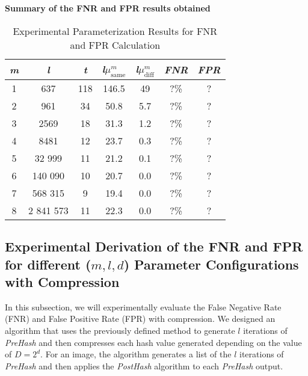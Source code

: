 \textbf{Summary of the FNR and FPR results obtained}
\begin{table}[htbp] 
    \centering
    \begin{tabular}{|c|c|c|c|c|c|c|}
        \hline
        \textit{m} & \textit{l} & \textit{t} & \textit{l}\(\mu_{\text{same}}^m\) & \textit{l}\(\mu_{\text{diff}}^m\) & \textit{FNR} & \textit{FPR} \\
        \hline
        1 & 637 & 118 & 146.5 & 49 & ?\% & ? \\
        2 & 961 & 34 & 50.8 & 5.7 & ?\% & ? \\
        3 & 2569 & 18 & 31.3 & 1.2 & ?\% & ? \\
        4 & 8481 & 12 & 23.7 & 0.3 & ?\% & ? \\
        5 & 32 999 & 11 & 21.2 & 0.1 & ?\% & ? \\
        6 & 140 090 & 10 & 20.7 & 0.0 & ?\% & ? \\
        7 & 568 315 & 9 & 19.4 & 0.0 & ?\% & ? \\
        8 & 2 841 573 & 11 & 22.3 & 0.0 & ?\% & ? \\
        \hline
    \end{tabular}
    \caption{Experimental Parameterization Results for FNR and FPR Calculation}
    \label{tab:experimental_parameterization}
\end{table}

\newpage
\subsection{Experimental Derivation of the FNR and FPR for different (\(m, l, d\)) Parameter Configurations with Compression}

In this subsection, we will experimentally evaluate the False Negative Rate (FNR) and False Positive Rate (FPR) with compression. We designed an algorithm that uses the previously defined method to generate \( l \) iterations of \textit{PreHash} and then compresses each hash value generated depending on the value of \(D = 2^d\). For an image, the algorithm generates a list of the \( l \) iterations of \textit{PreHash} and then applies the \textit{PostHash} algorithm to each \textit{PreHash} output.

